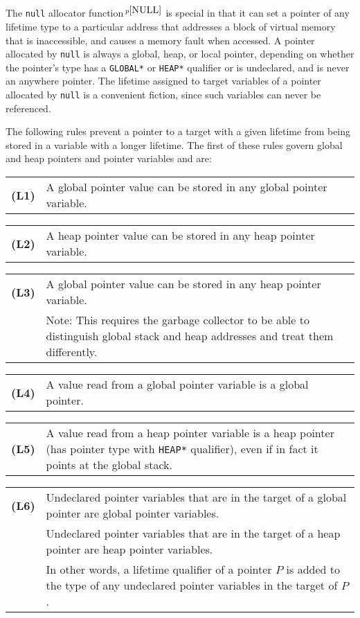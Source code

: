 \documentclass[12pt]{article}
\newcommand{\key}[1]{{\rm \bfseries #1}}
\newcommand{\pagnote}[1]{$\,^{p\pageref{#1}}$}
\newenvironment{indpar}[1][0.3in]%
	{\begin{list}{}%
		     {\setlength{\itemsep}{0in}%
		      \setlength{\topsep}{0in}%
		      \setlength{\parsep}{1ex}%
		      \setlength{\labelwidth}{#1}%
		      \setlength{\leftmargin}{#1}%
		      \addtolength{\leftmargin}{\labelsep}}%
	 \item}%
	{\end{list}}
\begin{document}
The {\tt null} allocator function\pagnote{NULL} is special in that
it can set a pointer of any lifetime type to a particular address
that addresses a block of virtual memory that is inaccessible, and
causes a memory fault when accessed.  A pointer allocated by {\tt null}
is always a global, heap, or local pointer, depending on whether
the pointer's type has a {\tt *GLOBAL*} or {\tt *HEAP*} qualifier
or is undeclared, and is never an anywhere pointer.
The lifetime assigned to target variables of a pointer allocated by {\tt null}
is a convenient fiction, since such variables can never be referenced.

The following rules prevent a pointer to a target with a given lifetime
from being stored in a variable with a longer lifetime.
The first of these rules govern global and heap pointers and
pointer variables and are:
\newcommand{\GlobalToHeap}{(L3)}
\newcommand{\UndeclaredToGlobalOrHeap}{(L6)}
\begin{indpar}[0.2in]
\begin{tabular}{p{0.5in}p{5.0in}}
\key{(L1)}	& A global pointer value
                  can be stored in any global pointer variable.
\end{tabular}

\begin{tabular}{p{0.5in}p{5.0in}}
\key{(L2)}	& A heap pointer value
                  can be stored in any heap pointer variable.
\end{tabular}

\begin{tabular}{p{0.5in}p{5.0in}}
\key{\GlobalToHeap}
		& A global pointer value
                  can be stored in any heap pointer variable.
\\[1ex]
		& Note: This requires the garbage collector to be able
		  to distinguish global stack
		  and heap addresses and treat them differently.
\end{tabular}

\begin{tabular}{p{0.5in}p{5.0in}}
\key{(L4)}	& A value read from a global pointer variable is a
		  global pointer.
\end{tabular}

\begin{tabular}{p{0.5in}p{5.0in}}
\key{(L5)}	& A value read from a heap pointer variable is a
		  heap pointer (has pointer type with {\tt *HEAP*}
		  qualifier), even if in fact it points at the
		  global stack.
\end{tabular}

\begin{tabular}{p{0.5in}p{5.0in}}
\key{\UndeclaredToGlobalOrHeap}
		& Undeclared pointer variables that are in the target
                  of a global pointer are global pointer variables.
\\[1ex]
		& Undeclared pointer variables that are in the target
                  of a heap pointer are heap pointer variables.
\\[1ex]
		& In other words, a lifetime qualifier of a pointer $P$
		  is added to the type of any undeclared pointer variables
		  in the target of $P$.
\end{tabular}


\end{indpar}
\end{document}
